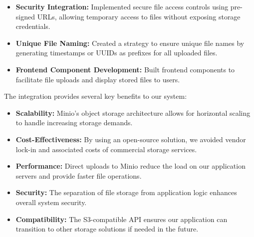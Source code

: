 \begin{itemize}
    \item \textbf{Security Integration:} Implemented secure file access controls using pre-signed URLs, allowing temporary access to files without exposing storage credentials.
    
    \item \textbf{Unique File Naming:} Created a strategy to ensure unique file names by generating timestamps or UUIDs as prefixes for all uploaded files.
    
    \item \textbf{Frontend Component Development:} Built frontend components to facilitate file uploads and display stored files to users.
\end{itemize}

The integration provides several key benefits to our system:

\begin{itemize}
    \item \textbf{Scalability:} Minio's object storage architecture allows for horizontal scaling to handle increasing storage demands.
    
    \item \textbf{Cost-Effectiveness:} By using an open-source solution, we avoided vendor lock-in and associated costs of commercial storage services.
    
    \item \textbf{Performance:} Direct uploads to Minio reduce the load on our application servers and provide faster file operations.
    
    \item \textbf{Security:} The separation of file storage from application logic enhances overall system security.
    
    \item \textbf{Compatibility:} The S3-compatible API ensures our application can transition to other storage solutions if needed in the future.
\end{itemize}